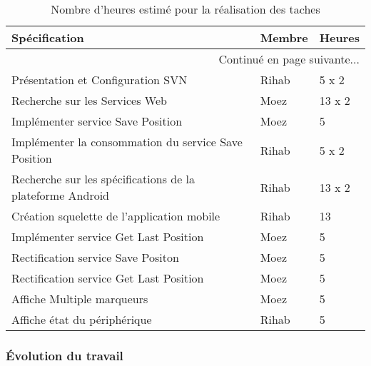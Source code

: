 \begin{center}
    \begin{longtable}{| l | l | l |}
        \caption{Nombre d'heures estimé pour la réalisation des taches}
        \label{tab:sprint1-estimation} \\

        \hline
        \textbf{Spécification} & \textbf{Membre} & \textbf{Heures} \\ \hline
        \endhead

        \hline \multicolumn{3}{|r|}{{Continué en page suivante$\dotsc$}} \\ \hline
        \endfoot

        \hline \hline
        \endlastfoot

        \hline
Présentation et Configuration SVN & Rihab & 5 x 2 \\ \hline
Recherche sur les Services Web & Moez & 13 x 2 \\ \hline
Implémenter service Save Position & Moez & 5 \\ \hline
Implémenter la consommation du service Save Position & Rihab & 5 x 2 \\ \hline
Recherche sur les spécifications de la plateforme Android & Rihab & 13 x 2 \\ \hline
Création squelette de l'application mobile & Rihab & 13 \\ \hline
Implémenter service Get Last Position & Moez & 5 \\ \hline
Rectification service Save Positon & Moez & 5 \\ \hline
Rectification service Get Last Position & Moez & 5 \\ \hline
Affiche Multiple marqueurs & Moez & 5 \\ \hline
Affiche état du périphérique & Rihab & 5 \\ \hline
    \end{longtable}
\end{center}

\subsubsection{Évolution du travail}


